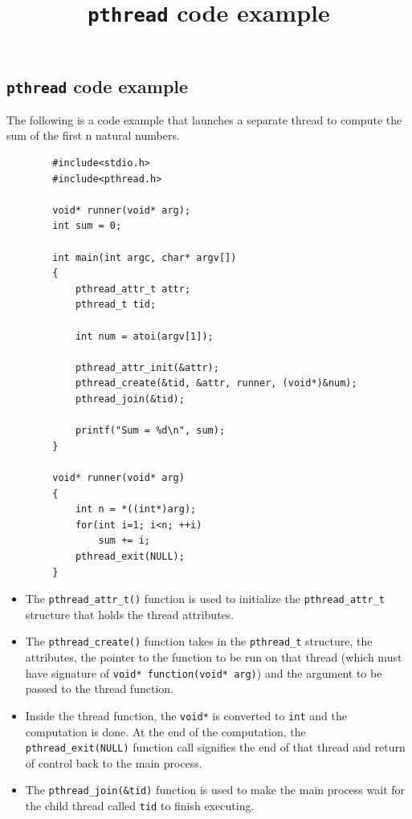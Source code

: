 \documentclass{article}
\theoremstyle{plain}
\theoremstyle{definition}
\begin{document}
\subsection{\texttt{pthread} code example}
The following is a code example that launches a separate thread to compute the sum of the first n natural numbers. 
\begin{listing}[ht]
\centering
    \begin{verbatim}
        #include<stdio.h>
        #include<pthread.h>
        
        void* runner(void* arg);
        int sum = 0;
        
        int main(int argc, char* argv[])
        {
            pthread_attr_t attr;
            pthread_t tid;
            
            int num = atoi(argv[1]);
            
            pthread_attr_init(&attr);
            pthread_create(&tid, &attr, runner, (void*)&num);
            pthread_join(&tid);
            
            printf("Sum = %d\n", sum);
        }
        
        void* runner(void* arg)
        {
            int n = *((int*)arg);
            for(int i=1; i<n; ++i)
                sum += i;
            pthread_exit(NULL);
        }
    \end{verbatim}
    \title{\texttt{pthread} code example}
\end{listing}

\begin{itemize}
    \item The \texttt{pthread\_attr\_t()} function is used to initialize the \texttt{pthread\_attr\_t} structure that holds the thread attributes.
    
    \item The \texttt{pthread\_create()} function takes in the \texttt{pthread\_t} structure, the attributes, the pointer to the function to be run on that thread (which must have signature of \texttt{void* function(void* arg)}) and the argument to be passed to the thread function.
    
    \item Inside the thread function, the \texttt{void*} is converted to \texttt{int} and the computation is done. At the end of the computation, the \texttt{pthread\_exit(NULL)} function call signifies the end of that thread and return of control back to the main process.
    
    \item The \texttt{pthread\_join(\&tid)} function is used to make the main process wait for the child thread called \texttt{tid} to finish executing. 
    
\end{itemize}
\end{document}
